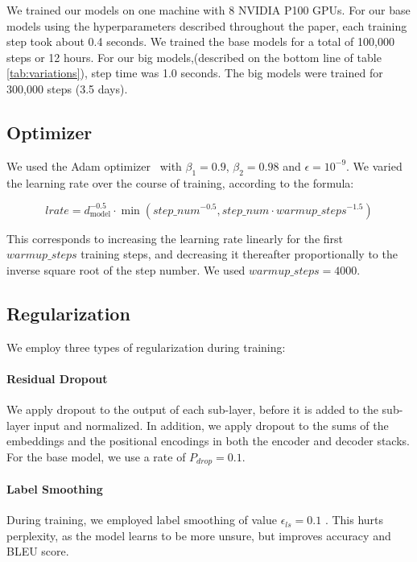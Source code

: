 \documentclass{article}
\newcommand{\dmodel}{d_{\text{model}}}
\begin{document}
We trained our models on one machine with 8 NVIDIA P100 GPUs.  For our base models using the hyperparameters described throughout the paper, each training step took about 0.4 seconds.  We trained the base models for a total of 100,000 steps or 12 hours.  For our big models,(described on the bottom line of table \ref{tab:variations}), step time was 1.0 seconds.  The big models were trained for 300,000 steps (3.5 days).

\subsection{Optimizer} We used the Adam optimizer~\citep{kingma2014adam} with $\beta_1=0.9$, $\beta_2=0.98$ and $\epsilon=10^{-9}$.  We varied the learning rate over the course of training, according to the formula:

\begin{equation}
lrate = \dmodel^{-0.5} \cdot
  \min({step\_num}^{-0.5},
    {step\_num} \cdot {warmup\_steps}^{-1.5})
\end{equation}

This corresponds to increasing the learning rate linearly for the first $warmup\_steps$ training steps, and decreasing it thereafter proportionally to the inverse square root of the step number.  We used $warmup\_steps=4000$.

\subsection{Regularization} \label{sec:reg}

We employ three types of regularization during training: 
\paragraph{Residual Dropout} We apply dropout \citep{srivastava2014dropout} to the output of each sub-layer, before it is added to the sub-layer input and normalized.   In addition, we apply dropout to the sums of the embeddings and the positional encodings in both the encoder and decoder stacks.  For the base model, we use a rate of $P_{drop}=0.1$.

\paragraph{Label Smoothing} During training, we employed label smoothing of value $\epsilon_{ls}=0.1$ \citep{DBLP:journals/corr/SzegedyVISW15}.  This hurts perplexity, as the model learns to be more unsure, but improves accuracy and BLEU score.
\end{document}
